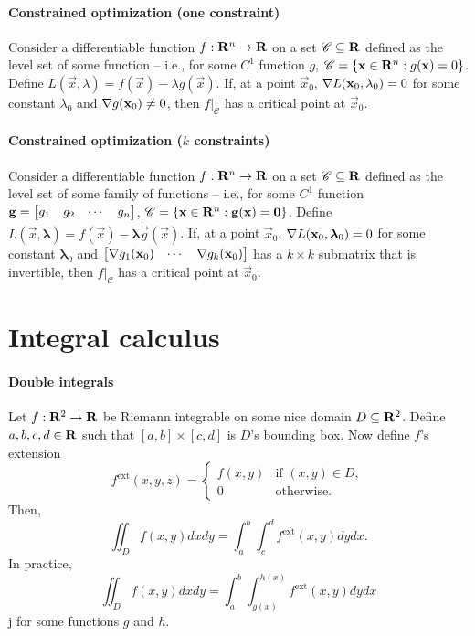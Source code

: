 \documentclass[10pt,landscape]{article}
\begin{document}
\begin{multicols*}{3}
\paragraph{Constrained optimization (one constraint)}
Consider a differentiable function $f : \mathbf{R}^n \to \mathbf{R}$ on a set $\mathscr{C} \subseteq \mathbf{R}$ defined as the level set of some function -- i.e., for some $C^1$ function $g$, $\mathscr{C} = \{ \mathbf{x} \in \mathbf{R}^n : g(\mathbf{x}) = 0 \}$.
Define $L(\vec x, \lambda) = f(\vec x) - \lambda g(\vec x)$.
If, at a point $\vec x_0$, $\nabla L(\mathbf{x}_0, \lambda_0) = 0$ for some constant $\lambda_0$ and $\nabla g(\mathbf{x}_0) \ne 0$, then $f\vert_\mathscr{C}$ has a critical point at $\vec x_0$.

\paragraph{Constrained optimization ($k$ constraints)}
Consider a differentiable function $f : \mathbf{R}^n \to \mathbf{R}$ on a set $\mathscr{C} \subseteq \mathbf{R}$ defined as the level set of some family of functions -- i.e., for some $C^1$ function $\mathbf{g} = \begin{bmatrix} g_1 & g_2 & \cdots & g_n \end{bmatrix}$, $\mathscr{C} = \{ \mathbf{x} \in \mathbf{R}^n : \mathbf{g}(\mathbf{x}) = \mathbf{0} \}$.
Define $L(\vec x, \boldsymbol\lambda) = f(\vec x) - \boldsymbol\lambda \dot \vec g(\vec x)$.
If, at a point $\vec x_0$, $\nabla L(\mathbf{x}_0, \boldsymbol\lambda_0) = 0$ for some constant $\boldsymbol\lambda_0$ and $\begin{bmatrix} \nabla g_1(\mathbf{x}_0) & \cdots & \nabla g_k(\mathbf{x}_0) \end{bmatrix}$ has a $k\times k$ submatrix that is invertible, then $f\vert_\mathscr{C}$ has a critical point at $\vec x_0$.

\section{Integral calculus}
\paragraph{Double integrals}
Let $f : \mathbf{R}^2 \to \mathbf{R}$ be Riemann integrable on some nice domain $D \subseteq \mathbf{R}^2$.
Define $a, b, c, d \in \mathbf{R}$ such that $[a,b] \times [c,d]$ is $D$'s bounding box.
Now define $f$'s extension
\begin{equation}
  f^{\text{ext}}(x,y,z) = \begin{cases}
    f(x,y) & \text{if $(x,y) \in D$},\\
    0 & \text{otherwise}.
    \end{cases}
\end{equation}
Then,
\begin{equation}
  \iint_D f(x,y) dxdy = \int_a^b \int_c^d f^{\text{ext}}(x,y) dydx.
\end{equation}
In practice,
\begin{equation}
  \iint_D f(x,y) dxdy = \int_a^b \int_{g(x)}^{h(x)} f^{\text{ext}}(x,y) dydx
\end{equation}j
for some functions $g$ and $h$.


\end{multicols*}
\end{document}
